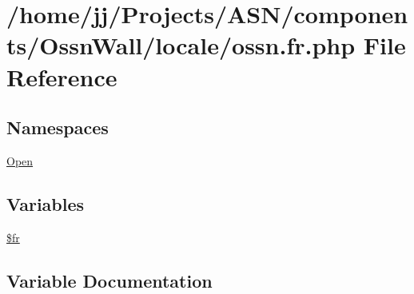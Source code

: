 \hypertarget{components_2_ossn_wall_2locale_2ossn_8fr_8php}{}\section{/home/jj/\+Projects/\+A\+S\+N/components/\+Ossn\+Wall/locale/ossn.fr.\+php File Reference}
\label{components_2_ossn_wall_2locale_2ossn_8fr_8php}
\subsection*{Namespaces}
\begin{DoxyCompactItemize}
\item 
 \hyperlink{namespace_open}{Open}
\end{DoxyCompactItemize}
\subsection*{Variables}
\begin{DoxyCompactItemize}
\item 
\hyperlink{components_2_ossn_wall_2locale_2ossn_8fr_8php_ad5107c697816e7b7f89ad1b3e94e3e0e}{\$fr}
\end{DoxyCompactItemize}


\subsection{Variable Documentation}
